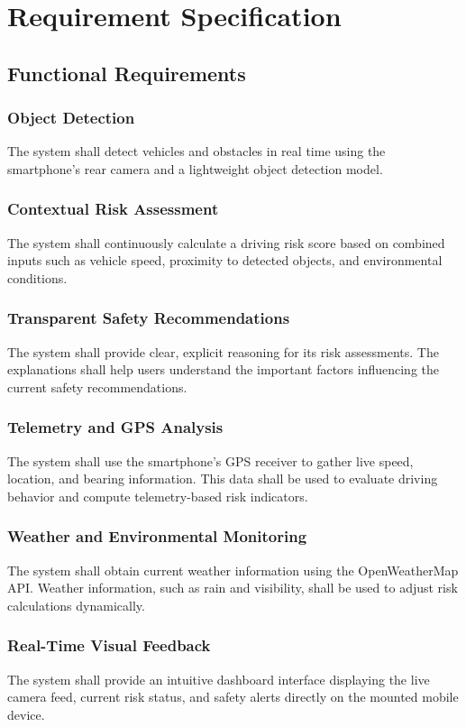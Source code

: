 \chapter{Requirement Specification}

\section{Functional Requirements}

\subsection{Object Detection}
The system shall detect vehicles and obstacles in real time using the smartphone's rear camera and a lightweight object detection model.

\subsection{Contextual Risk Assessment}
The system shall continuously calculate a driving risk score based on combined inputs such as vehicle speed, proximity to detected objects, and environmental conditions.

\subsection{Transparent Safety Recommendations}
The system shall provide clear, explicit reasoning for its risk assessments. The explanations shall help users understand the important factors influencing the current safety recommendations.

\subsection{Telemetry and GPS Analysis}
The system shall use the smartphone's GPS receiver to gather live speed, location, and bearing information. This data shall be used to evaluate driving behavior and compute telemetry-based risk indicators.

\subsection{Weather and Environmental Monitoring}
The system shall obtain current weather information using the OpenWeatherMap API. Weather information, such as rain and visibility, shall be used to adjust risk calculations dynamically.

\subsection{Real-Time Visual Feedback}
The system shall provide an intuitive dashboard interface displaying the live camera feed, current risk status, and safety alerts directly on the mounted mobile device.

